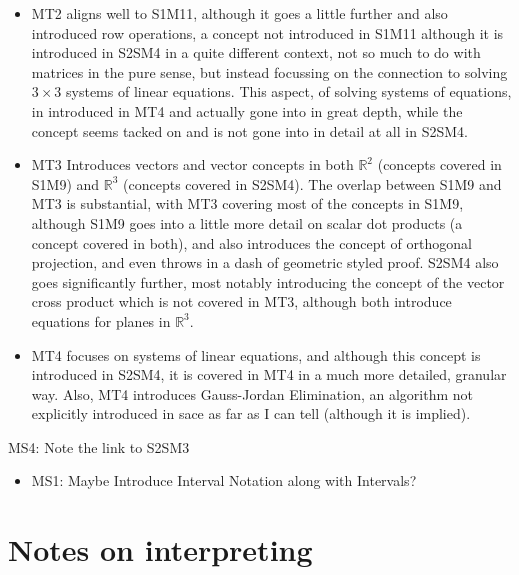 \documentclass[twoside,12pt,a4paper]{report}
\begin{document}
\begin{itemize}
		\begin{itemize}
			\item MT2 aligns well to S1M11, although it goes a little further and also introduced row operations, a concept not introduced in S1M11 although it is introduced in S2SM4 in a quite different context, not so much to do with matrices in the pure sense, but instead focussing on the connection to solving $3 \times 3$ systems of linear equations. This aspect, of solving systems of equations, in introduced in MT4 and actually gone into in great depth, while the concept seems tacked on and is not gone into in detail at all in S2SM4.
			\item MT3 Introduces vectors and vector concepts in both $\mathbb{R}^2$ (concepts covered in S1M9) and $\mathbb{R}^3$ (concepts covered in S2SM4). The overlap between S1M9 and MT3 is substantial, with MT3 covering most of the concepts in S1M9, although S1M9 goes into a little more detail on scalar dot products (a concept covered in both), and also introduces the concept of orthogonal projection, and even throws in a dash of geometric styled proof. S2SM4 also goes significantly further, most notably introducing the concept of the vector cross product which is not covered in MT3, although both introduce equations for planes in $\mathbb{R}^3$.
			\item MT4 focuses on systems of linear equations, and although this concept is introduced in S2SM4, it is covered in MT4 in a much more detailed, granular way. Also, MT4 introduces Gauss-Jordan Elimination, an algorithm not explicitly introduced in \gls{sace} as far as I can tell (although it is implied).
		\end{itemize}
\end{itemize}


MS4: Note the link to S2SM3 

\begin{itemize}
	\item MS1: Maybe Introduce Interval Notation along with Intervals?
\end{itemize}


\section{Notes on interpreting }
\end{document}
